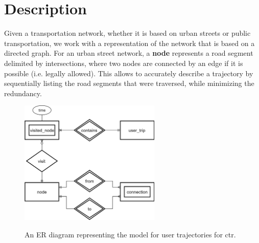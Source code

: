 \section{Description}
\label{sec:ctr:desc}
    Given a transportation network, whether it is based on urban streets or public transportation, we work with a representation of the network that is based on a directed graph. For an urban street network, a \textbf{node} represents a road segment delimited by intersections, where two nodes are connected by an edge if it is possible (i.e. legally allowed). This allows to accurately describe a trajectory by sequentially listing the road segments that were traversed, while minimizing the redundancy.

	
	\begin{figure}[ht]
		\begin{center}
			{\includegraphics[width=0.6\textwidth]{figures/street_er.png}}
		\end{center}
		\caption{An ER diagram representing the model for user trajectories for \acrshort{ctr}.}
		\label{fig:street_er}
	\end{figure}
    
